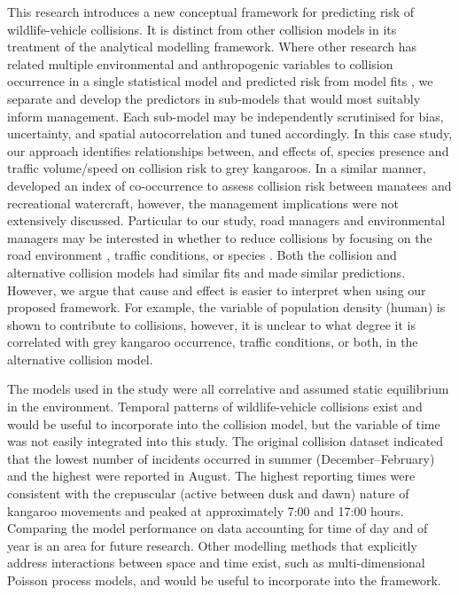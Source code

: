 This research introduces a new conceptual framework for predicting risk of wildlife-vehicle collisions. It is distinct from other collision models in its treatment of the analytical modelling framework. Where other research has related multiple environmental and anthropogenic variables to collision occurrence in a single statistical model \citep[e.g.][]{lee04,ramp05,kloc06,litv08,guns09,roge09} and predicted risk from model fits \citep[e.g.][]{malo04,sudh09,guns12}, we separate and develop the predictors in sub-models that would most suitably inform management. Each sub-model may be independently scrutinised for bias, uncertainty, and spatial autocorrelation and tuned accordingly. In this case study, our approach identifies relationships between, and effects of, species presence and traffic volume/speed on collision risk to grey kangaroos. In a similar manner, \cite{baud13} developed an index of co-occurrence to assess collision risk between manatees and recreational watercraft, however, the management implications were not extensively discussed. Particular to our study, road managers and environmental managers may be interested in whether to reduce collisions by focusing on the road environment \citep[e.g.][]{clev02,jaeg04,bond08,bond13}, traffic conditions, or species \citep[e.g.][]{huij03,huij06}. Both the collision and alternative collision models had similar fits and made similar predictions. However, we argue that cause and effect is easier to interpret when using our proposed framework. For example, the variable of population density (human) is shown to contribute to collisions, however, it is unclear to what degree it is correlated with grey kangaroo occurrence, traffic conditions, or both, in the alternative collision model.

The models used in the study were all correlative and assumed static equilibrium in the environment. Temporal patterns of wildlife-vehicle collisions exist and would be useful to incorporate into the collision model, but the variable of time was not easily integrated into this study. The original collision dataset indicated that the lowest number of incidents occurred in summer (December--February) and the highest were reported in August. The highest reporting times were consistent with the crepuscular (active between dusk and dawn) nature of kangaroo movements \citep{mccu00} and peaked at approximately 7:00 and 17:00 hours. Comparing the model performance on data accounting for time of day and of year is an area for future research. Other modelling methods that explicitly address interactions between space and time exist, such as multi-dimensional Poisson process models, and would be useful to incorporate into the framework.


